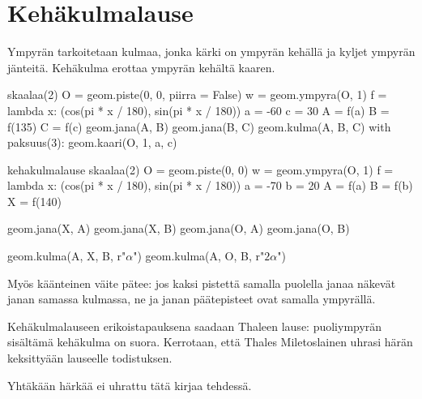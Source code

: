 \section*{Kehäkulmalause}

Ympyrän  tarkoitetaan kulmaa, jonka kärki on ympyrän kehällä ja kyljet ympyrän jänteitä. Kehäkulma erottaa ympyrän kehältä kaaren.
\begin{center}
\begin{kuva}
	skaalaa(2)
	O = geom.piste(0, 0, piirra = False)
	w = geom.ympyra(O, 1)
	f = lambda x: (cos(pi * x / 180), sin(pi * x / 180))
	a = -60
	c = 30
	A = f(a)
	B = f(135)
	C = f(c)
	geom.jana(A, B)
	geom.jana(B, C)
	geom.kulma(A, B, C)
	with paksuus(3):
		geom.kaari(O, 1, a, c)
\end{kuva}
\end{center}

\begin{luoKuva}{kehakulmalause}
	skaalaa(2)
	O = geom.piste(0, 0)
	w = geom.ympyra(O, 1)
	f = lambda x: (cos(pi * x / 180), sin(pi * x / 180))
	a = -70
	b = 20
	A = f(a)
	B = f(b)
	X = f(140)
	
	geom.jana(X, A)
	geom.jana(X, B)
	geom.jana(O, A)
	geom.jana(O, B)
	
	geom.kulma(A, X, B, r"$\alpha$")
	geom.kulma(A, O, B, r"$2\alpha$")
\end{luoKuva}


Myös käänteinen väite pätee: jos kaksi pistettä samalla puolella janaa näkevät janan samassa kulmassa, ne ja janan päätepisteet ovat samalla ympyrällä.

Kehäkulmalauseen erikoistapauksena saadaan Thaleen lause: puoliympyrän sisältämä kehäkulma on suora. Kerrotaan, että Thales Miletoslainen uhrasi härän keksittyään lauseelle todistuksen.

Yhtäkään härkää ei uhrattu tätä kirjaa tehdessä.

